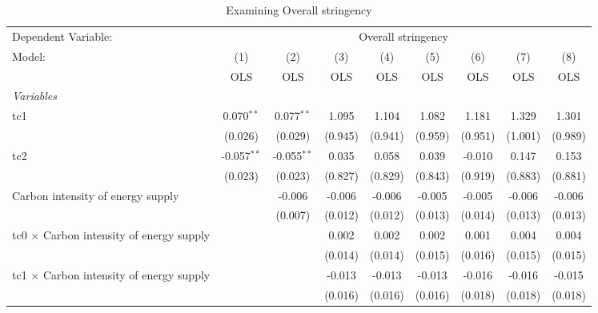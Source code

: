 
\begin{table}[htbp]
   \caption{Examining Overall stringency}
   \centering
   \begin{tabular}{lcccccccc}
      \toprule
      Dependent Variable: & \multicolumn{8}{c}{Overall stringency}\\
      Model:                                          & (1)           & (2)           & (3)     & (4)     & (5)     & (6)     & (7)     & (8)\\  
                                                      &  OLS          & OLS           & OLS     & OLS     & OLS     & OLS     & OLS     & OLS\\  
      \midrule
      \emph{Variables}\\
      tc1                                             & 0.070$^{**}$  & 0.077$^{**}$  & 1.095   & 1.104   & 1.082   & 1.181   & 1.329   & 1.301\\   
                                                      & (0.026)       & (0.029)       & (0.945) & (0.941) & (0.959) & (0.951) & (1.001) & (0.989)\\   
      tc2                                             & -0.057$^{**}$ & -0.055$^{**}$ & 0.035   & 0.058   & 0.039   & -0.010  & 0.147   & 0.153\\   
                                                      & (0.023)       & (0.023)       & (0.827) & (0.829) & (0.843) & (0.919) & (0.883) & (0.881)\\   
      Carbon intensity of energy supply               &               & -0.006        & -0.006  & -0.006  & -0.005  & -0.005  & -0.006  & -0.006\\   
                                                      &               & (0.007)       & (0.012) & (0.012) & (0.013) & (0.014) & (0.013) & (0.013)\\   
      tc0 $\times$ Carbon intensity of energy supply  &               &               & 0.002   & 0.002   & 0.002   & 0.001   & 0.004   & 0.004\\   
                                                      &               &               & (0.014) & (0.014) & (0.015) & (0.016) & (0.015) & (0.015)\\   
      tc1 $\times$ Carbon intensity of energy supply  &               &               & -0.013  & -0.013  & -0.013  & -0.016  & -0.016  & -0.015\\   
                                                      &               &               & (0.016) & (0.016) & (0.016) & (0.018) & (0.018) & (0.018)\\   

\end{tabular}
\end{table}
